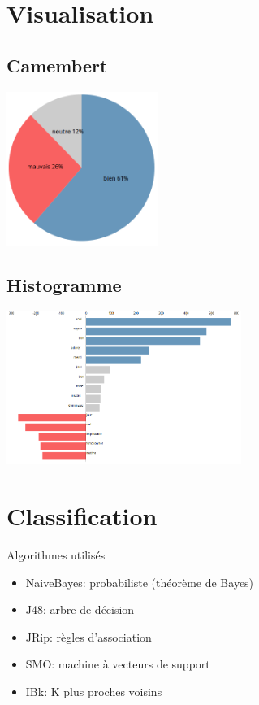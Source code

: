 \documentclass{beamer}
\begin{document}
\section{Visualisation}
\subsection{Camembert}
\begin{frame}
	\includegraphics[height=5cm]{imgs/visu1.png}
\end{frame}

\subsection{Histogramme}
\begin{frame}
	\includegraphics[height=5cm]{imgs/visu2.png}
\end{frame}

\section{Classification}

\begin{frame}
	\begin{block}{Algorithmes utilisés}
		\begin{itemize}
			\item NaiveBayes: probabiliste (théorème de Bayes)
			\item J48: arbre de décision
			\item JRip: règles d'association
			\item SMO: machine à vecteurs de support
			\item IBk: K plus proches voisins
		\end{itemize}
	\end{block}
\end{frame}
\end{document}
